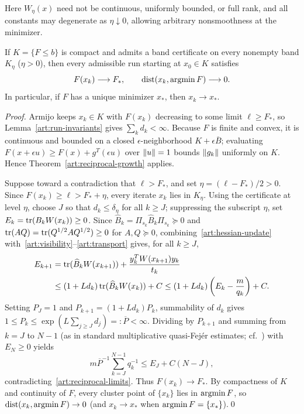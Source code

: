 Here $W_\eta(x)$ need not be continuous, uniformly bounded, or full rank, and
all constants may degenerate as $\eta\downarrow0$, allowing arbitrary
nonsmoothness at the minimizer.

\begin{theorem}\label{art:certificate}
If $K=\{F\le b\}$ is compact and admits a band certificate on every nonempty
band $K_\eta$ ($\eta>0$), then every admissible run starting at $x_0\in K$
satisfies
\[
 F(x_k)\longrightarrow F_*,\qquad
 \operatorname{dist}(x_k,\operatorname{argmin} F)\longrightarrow0.
\]
In particular, if $F$ has a unique minimizer $x_*$, then $x_k\to x_*$.
\end{theorem}
\begin{proof}
Armijo keeps $x_k\in K$ with $F(x_k)$ decreasing to some limit $\ell\ge F_*$, so
Lemma~\ref{art:run-invariants} gives $\sum_kd_k<\infty$. Because $F$ is finite
and convex, it is continuous and bounded on a closed $\epsilon$-neighborhood
$K+\epsilon\overline B$; evaluating $F(x+\epsilon u)\ge F(x)+g^T(\epsilon u)$ over
$\lVert u\rVert=1$ bounds $\lVert g_k\rVert$ uniformly on $K$. Hence
Theorem~\ref{art:reciprocal-growth} applies.

Suppose toward a contradiction that $\ell>F_*$, and set $\eta=(\ell-F_*)/2>0$.
Since $F(x_k)\ge\ell>F_*+\eta$, every iterate $x_k$ lies in $K_\eta$. Using the
certificate at level $\eta$, choose $J$ so that $d_k\le\delta_\eta$ for all
$k\ge J$; suppressing the subscript $\eta$, set $E_k=\operatorname{tr}(B_kW(x_k))\ge0$. Since
$\widehat B_k=\Pi_{s_k}\widehat B_k\Pi_{s_k}\succeq0$ and $\operatorname{tr}(AQ)=\operatorname{tr}(Q^{1/2}AQ^{1/2})\ge0$
for $A,Q\succeq0$, combining~\eqref{art:hessian-update}
with~\eqref{art:visibility}--\eqref{art:transport} gives, for all $k\ge J$,
\begin{align*}
 E_{k+1}
 &=\operatorname{tr}(\widehat B_kW(x_{k+1}))+\frac{y_k^TW(x_{k+1})y_k}{t_k}\\
 &\le(1+Ld_k)\operatorname{tr}(\widehat B_kW(x_k))+C
 \le(1+Ld_k)\left(E_k-\frac{m}{q_k}\right)+C.
\end{align*}
Setting $P_J=1$ and $P_{k+1}=(1+Ld_k)P_k$, summability of $d_k$ gives
$1\le P_k\le\exp(L\sum_{j\ge J}d_j)=:\overline P<\infty$. Dividing by $P_{k+1}$
and summing from $k=J$ to $N-1$ (as in standard multiplicative quasi-Fej\'er
estimates; cf.~\cite[Lemmas~2.2--2.3]{FND_CV13}) with $E_N\ge0$ yields
\[
 m\overline P^{-1}\sum_{k=J}^{N-1}q_k^{-1}\le E_J+C(N-J),
\]
contradicting~\eqref{art:reciprocal-limits}. Thus $F(x_k)\to F_*$. By
compactness of $K$ and continuity of $F$, every cluster point of $\{x_k\}$ lies
in $\operatorname{argmin} F$, so $\operatorname{dist}(x_k,\operatorname{argmin} F)\to0$ (and $x_k\to x_*$ when
$\operatorname{argmin} F=\{x_*\}$).\qed
\end{proof}


